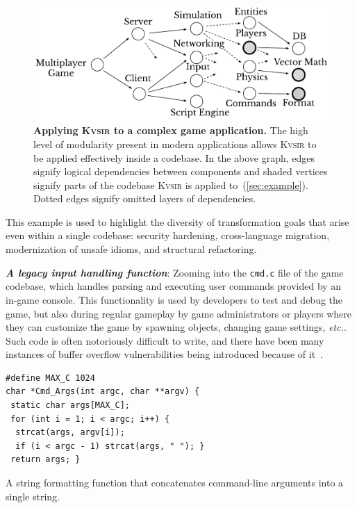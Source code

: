 \documentclass[sigplan,review,anonymous,10pt]{acmart}
\def\etc{{\em etc.}\xspace}
\newcommand{\sys}{{\scshape Kv{\textalpha}sir}\xspace}
\newcommand{\heading}[1]{\vspace{2pt}\noindent\textbf{\emph{#1}}:\enspace}
\newcommand{\ttt}[1]{\texttt{#1}\xspace}
\begin{document}
\begin{figure}[t]
\centering
  \includegraphics[width=.9\columnwidth]{figs/kvasir_application.pdf}
  \caption{\textbf{Applying \sys to a complex game application.}
  The high level of modularity present in modern applications allows \sys to be applied effectively inside a codebase.
  In the above graph, edges signify logical dependencies between components 
  and shaded vertices signify parts of the codebase \sys is applied to~(\cref{sec:example}).
  Dotted edges signify omitted layers of dependencies.
  }
  \label{fig:ex-large-app}
\end{figure}

This example is used to highlight the
diversity of transformation goals that arise even within a single codebase:
security hardening, cross-language migration, modernization of unsafe idioms,
and structural refactoring.

\heading{A legacy input handling function}
Zooming into the \ttt{cmd.c} file of the game codebase, 
which handles parsing and executing user commands provided by an in-game console.
This functionality is used by developers to test and debug the game, but also during regular gameplay
by game administrators or players where they can customize the game by spawning objects, changing game settings, \etc.
Such code is often notoriously difficult to write,
and there have been many instances of buffer overflow vulnerabilities being introduced because of it~\cite{CVE-2006-3400, CVE-2006-3401, CVE-2007-5248, CVE-2019-1010043}.
\begin{listing}
\begin{verbatim}
#define MAX_C 1024
char *Cmd_Args(int argc, char **argv) {
 static char args[MAX_C];
 for (int i = 1; i < argc; i++) {
  strcat(args, argv[i]);
  if (i < argc - 1) strcat(args, " "); }
 return args; }
\end{verbatim}
\caption{A string formatting function that concatenates command-line arguments into a single string.}
\end{listing}
\end{document}
